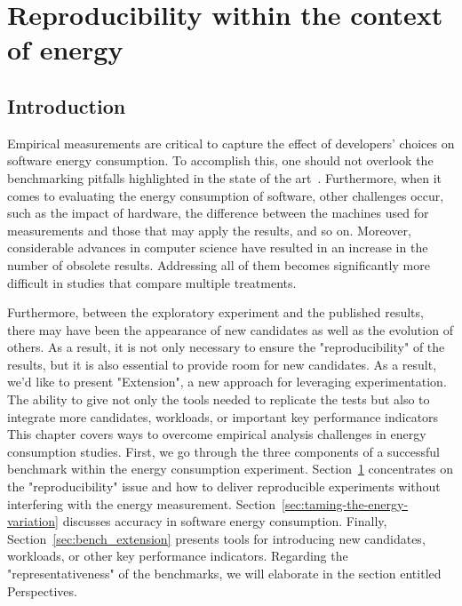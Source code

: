 \section{Reproducibility within the context of energy}\label{sec:benchmarking_reproducibility}
\subsection{Introduction}

Empirical measurements are critical to capture the effect of developers' choices on software energy consumption.
To accomplish this, one should not overlook the benchmarking pitfalls highlighted in the state of the art~\cite{van_der_kouwe_benchmarking_2018}.
Furthermore, when it comes to evaluating the energy consumption of software, other challenges occur, such as the impact of hardware, the difference between the machines used for measurements and those that may apply the results, and so on.
Moreover, considerable advances in computer science have resulted in an increase in the number of obsolete results.
Addressing all of them becomes significantly more difficult in studies that compare multiple treatments.

Furthermore, between the exploratory experiment and the published results, there may have been the appearance of new candidates as well as the evolution of others.
As a result, it is not only necessary to ensure the "reproducibility" of the results, but it is also essential to provide room for new candidates.
As a result, we'd like to present "Extension", a new approach for leveraging experimentation.
The ability to give not only the tools needed to replicate the tests but also to integrate more candidates, workloads, or important key performance indicators
This chapter covers ways to overcome empirical analysis challenges in energy consumption studies. First, we go through the three components of a successful benchmark within the energy consumption experiment. Section~\ref{sec:benchmarking_reproducibility} concentrates on the "reproducibility" issue and how to deliver reproducible experiments without interfering with the energy measurement. Section~\ref{sec:taming-the-energy-variation} discusses accuracy in software energy consumption.
Finally, Section~\ref{sec:bench_extension} presents tools for introducing new candidates, workloads, or other key performance indicators.
Regarding the "representativeness" of the benchmarks, we will elaborate in the section entitled Perspectives.



